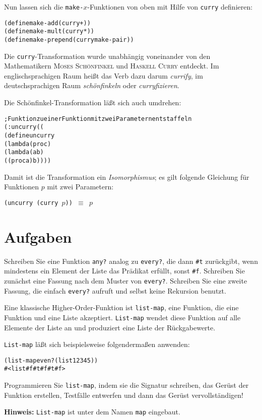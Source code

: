 %
Nun lassen sich die \texttt{make-$x$}-Funktionen von oben mit Hilfe
von \texttt{curry} definieren:
%
\begin{alltt}
(define make-add (curry +))
(define make-mult (curry *))
(define make-prepend (curry make-pair))
\end{alltt}
%
Die \texttt{curry}-Transformation wurde unabhängig voneinander von den
Mathematikern \textsc{Moses Schönfinkel} und \textsc{Haskell Curry} entdeckt.  Im
englischsprachigen Raum heißt das Verb dazu darum  \textit{currify}, im deutschsprachigen Raum
\textit{schönfinkeln}
oder \textit{curryfizieren}.

Die Schönfinkel-Transformation läßt sich auch umdrehen:
%
\begin{alltt}
; Funktion zu einer Funktion mit zwei Parametern entstaffeln
(: uncurry ((%a -> (%b -> %c)) -> (%a %b -> %c)))
(define uncurry 
  (lambda (proc)
    (lambda (a b)
      ((proc a) b))))
\end{alltt}
%
Damit ist die Transformation ein \textit{Isomorphismus}; es gilt
folgende Gleichung für Funktionen $p$ mit zwei Parametern:\label{sec:curry-isomorphismus}
%
\begin{center}
  \texttt{(uncurry (curry \(p\))) \(\equiv\) \(p\)}
\end{center}

\section*{Aufgaben}

\begin{aufgabe}
  Schreiben Sie eine Funktion \texttt{any?} analog zu 
  \texttt{every?}, die dann \verb|#t| zurückgibt, wenn mindestens ein 
  Element der Liste das Prädikat erfüllt, sonst \verb|#f|.  Schreiben Sie 
  zunächst eine Fassung nach dem Muster von \texttt{every?}.  Schreiben 
  Sie eine zweite Fassung, die einfach \texttt{every?} aufruft und selbst keine
  Rekursion benutzt.
\end{aufgabe}

\begin{aufgabe}
  Eine klassische Higher-Order-Funktion ist \texttt{list-map}, eine Funktion, die 
  eine Funktion und eine Liste akzeptiert.  \texttt{List-map}
  wendet diese Funktion auf alle Elemente der Liste an und produziert
  eine Liste der Rückgabewerte.

  \texttt{List-map} läßt sich beispielsweise folgendermaßen anwenden:
  \begin{alltt}
    (list-map even? (list 1 2 3 4 5))
    \evalsto{} #<list #f #t #f #t #f>
  \end{alltt}
  Programmieren Sie \texttt{list-map}, indem sie die Signatur schreiben,
  das Gerüst der Funktion erstellen, Testfälle entwerfen und dann das
  Gerüst vervollständigen!

  \textbf{Hinweis:} \texttt{List-map} ist unter dem Namen \texttt{map} eingebaut.
\end{aufgabe}

